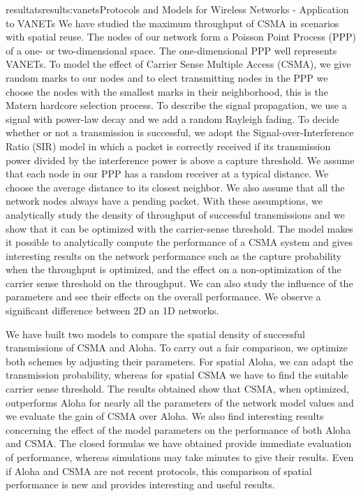 \documentclass{ra2016}
\begin{document}
\begin{module}{resultats}{results:vanets}{Protocols and Models for Wireless Networks - Application to VANETs}
We have studied  the maximum throughput of CSMA in scenarios with spatial reuse.
The nodes of our network form a Poisson Point Process (PPP) of a one- or two-dimensional space.
The one-dimensional PPP well represents VANETs.
To model the effect of Carrier Sense Multiple Access (CSMA), we give random marks to our nodes and to elect transmitting nodes in the PPP we choose the nodes with the smallest marks in their neighborhood, this is the Matern hardcore selection process.
To describe the signal propagation, we use a signal with power-law decay and we add a random Rayleigh fading.
To decide whether or not a transmission is successful, we adopt the Signal-over-Interference Ratio (SIR) model in which a packet is correctly received if its transmission power divided by the interference power is above a capture threshold.
We assume that each node in our PPP has a random receiver at a typical distance.
We choose the average distance to its closest neighbor.
We also assume that all the network nodes always have a pending packet.
With these assumptions, we analytically study the density of throughput of successful transmissions and we show that it can be optimized with the carrier-sense threshold. 
 The model makes it possible to analytically compute the 
 performance of a CSMA system and gives 
 interesting results on the network performance such as the capture probability 
 when the throughput is optimized, and the effect on a non-optimization of the 
 carrier sense threshold on the throughput. We can also study the influence 
of the parameters and  see their effects on the overall performance. 
We observe a significant difference between 2D an 1D networks.


We have built two models  to compare the spatial density of successful 
transmissions of CSMA and Aloha. 
To carry out a  fair comparison, we optimize both schemes by adjusting their parameters. 
For spatial Aloha, we can adapt the 
transmission probability, whereas for spatial CSMA we have to find the suitable carrier sense threshold. The results obtained show that CSMA, when optimized, outperforms Aloha 
for nearly all the parameters of the network model values 
and we evaluate the gain of CSMA over Aloha. 
We also find interesting results concerning the effect of the model parameters on the performance 
of both Aloha and CSMA. 
The closed formulas we have obtained provide immediate evaluation of performance, whereas 
simulations may take minutes to give their results. Even if Aloha and CSMA are not recent protocols, 
this comparison of spatial performance is new and provides interesting and useful results. 


\end{module}
\end{document}
